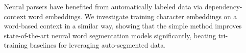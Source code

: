 Neural parsers have benefited from automatically labeled data via dependency-context word embeddings. We investigate training character embeddings on a word-based context in a similar way, showing that the simple method improves state-of-the-art neural word segmentation models significantly, beating tri-training baselines for leveraging auto-segmented data.

